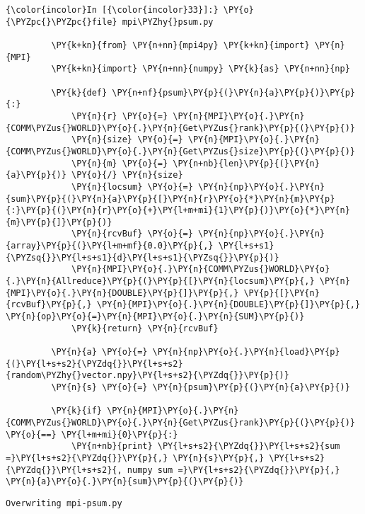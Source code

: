     \begin{Verbatim}[commandchars=\\\{\}]
{\color{incolor}In [{\color{incolor}33}]:} \PY{o}{\PYZpc{}\PYZpc{}file} mpi\PYZhy{}psum.py
         
         \PY{k+kn}{from} \PY{n+nn}{mpi4py} \PY{k+kn}{import} \PY{n}{MPI}
         \PY{k+kn}{import} \PY{n+nn}{numpy} \PY{k}{as} \PY{n+nn}{np}
         
         \PY{k}{def} \PY{n+nf}{psum}\PY{p}{(}\PY{n}{a}\PY{p}{)}\PY{p}{:}
             \PY{n}{r} \PY{o}{=} \PY{n}{MPI}\PY{o}{.}\PY{n}{COMM\PYZus{}WORLD}\PY{o}{.}\PY{n}{Get\PYZus{}rank}\PY{p}{(}\PY{p}{)}
             \PY{n}{size} \PY{o}{=} \PY{n}{MPI}\PY{o}{.}\PY{n}{COMM\PYZus{}WORLD}\PY{o}{.}\PY{n}{Get\PYZus{}size}\PY{p}{(}\PY{p}{)}
             \PY{n}{m} \PY{o}{=} \PY{n+nb}{len}\PY{p}{(}\PY{n}{a}\PY{p}{)} \PY{o}{/} \PY{n}{size}
             \PY{n}{locsum} \PY{o}{=} \PY{n}{np}\PY{o}{.}\PY{n}{sum}\PY{p}{(}\PY{n}{a}\PY{p}{[}\PY{n}{r}\PY{o}{*}\PY{n}{m}\PY{p}{:}\PY{p}{(}\PY{n}{r}\PY{o}{+}\PY{l+m+mi}{1}\PY{p}{)}\PY{o}{*}\PY{n}{m}\PY{p}{]}\PY{p}{)}
             \PY{n}{rcvBuf} \PY{o}{=} \PY{n}{np}\PY{o}{.}\PY{n}{array}\PY{p}{(}\PY{l+m+mf}{0.0}\PY{p}{,} \PY{l+s+s1}{\PYZsq{}}\PY{l+s+s1}{d}\PY{l+s+s1}{\PYZsq{}}\PY{p}{)}
             \PY{n}{MPI}\PY{o}{.}\PY{n}{COMM\PYZus{}WORLD}\PY{o}{.}\PY{n}{Allreduce}\PY{p}{(}\PY{p}{[}\PY{n}{locsum}\PY{p}{,} \PY{n}{MPI}\PY{o}{.}\PY{n}{DOUBLE}\PY{p}{]}\PY{p}{,} \PY{p}{[}\PY{n}{rcvBuf}\PY{p}{,} \PY{n}{MPI}\PY{o}{.}\PY{n}{DOUBLE}\PY{p}{]}\PY{p}{,} \PY{n}{op}\PY{o}{=}\PY{n}{MPI}\PY{o}{.}\PY{n}{SUM}\PY{p}{)}
             \PY{k}{return} \PY{n}{rcvBuf}
         
         \PY{n}{a} \PY{o}{=} \PY{n}{np}\PY{o}{.}\PY{n}{load}\PY{p}{(}\PY{l+s+s2}{\PYZdq{}}\PY{l+s+s2}{random\PYZhy{}vector.npy}\PY{l+s+s2}{\PYZdq{}}\PY{p}{)}
         \PY{n}{s} \PY{o}{=} \PY{n}{psum}\PY{p}{(}\PY{n}{a}\PY{p}{)}
         
         \PY{k}{if} \PY{n}{MPI}\PY{o}{.}\PY{n}{COMM\PYZus{}WORLD}\PY{o}{.}\PY{n}{Get\PYZus{}rank}\PY{p}{(}\PY{p}{)} \PY{o}{==} \PY{l+m+mi}{0}\PY{p}{:}
             \PY{n+nb}{print} \PY{l+s+s2}{\PYZdq{}}\PY{l+s+s2}{sum =}\PY{l+s+s2}{\PYZdq{}}\PY{p}{,} \PY{n}{s}\PY{p}{,} \PY{l+s+s2}{\PYZdq{}}\PY{l+s+s2}{, numpy sum =}\PY{l+s+s2}{\PYZdq{}}\PY{p}{,} \PY{n}{a}\PY{o}{.}\PY{n}{sum}\PY{p}{(}\PY{p}{)}
\end{Verbatim}

    \begin{Verbatim}[commandchars=\\\{\}]
Overwriting mpi-psum.py

    \end{Verbatim}

